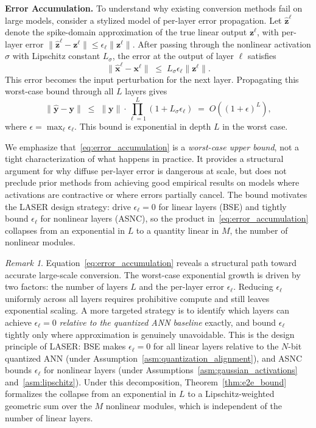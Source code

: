 \documentclass{article}
\theoremstyle{plain}
\theoremstyle{definition}
\theoremstyle{remark}
\newtheorem{remark}[theorem]{Remark}
\begin{document}
\noindent\textbf{Error Accumulation.}
\label{subsec:error_accumulation}
To understand why existing conversion methods fail on large models, consider a stylized
model of per-layer error propagation. Let
$\hat{\mathbf{z}}^\ell$ denote the spike-domain approximation of the true linear
output $\mathbf{z}^\ell$, with per-layer error
$\|\hat{\mathbf{z}}^\ell - \mathbf{z}^\ell\| \le \epsilon_\ell
\|\mathbf{z}^\ell\|$.
After passing through the nonlinear activation $\sigma$ with Lipschitz constant
$L_\sigma$, the error at the output of layer $\ell$ satisfies
\[
\|\hat{\mathbf{x}}^\ell - \mathbf{x}^\ell\|
\;\le\; L_\sigma \epsilon_\ell \|\mathbf{z}^\ell\|.
\]
This error becomes the input perturbation for the next layer. Propagating this
worst-case bound through all $L$ layers gives
\begin{equation}
\label{eq:error_accumulation}
\bigl\|\hat{\mathbf{y}} - \mathbf{y}\bigr\|
\;\le\; \|\mathbf{y}\| \cdot \prod_{\ell=1}^{L}(1 + L_\sigma \epsilon_\ell)
\;=\; O\!\left((1 + \epsilon)^L\right),
\end{equation}
where $\epsilon = \max_\ell \epsilon_\ell$. This bound is exponential in depth
$L$ in the worst case.

We emphasize that~\eqref{eq:error_accumulation} is a \emph{worst-case upper bound},
not a tight characterization of what happens in practice. It provides a structural
argument for why diffuse per-layer error is dangerous at scale, but does not preclude
prior methods from achieving good empirical results on models where activations are
contractive or where errors partially cancel. The bound motivates the LASER design
strategy: drive $\epsilon_\ell = 0$ for linear layers (BSE) and tightly bound
$\epsilon_\ell$ for nonlinear layers (ASNC), so the product
in~\eqref{eq:error_accumulation} collapses from an exponential in $L$ to a quantity
linear in $M$, the number of nonlinear modules.

\begin{remark}
\label{rem:error_structure}
Equation~\eqref{eq:error_accumulation} reveals a structural path toward accurate
large-scale conversion. The worst-case exponential growth is driven by two factors:
the number of layers $L$ and the per-layer error $\epsilon_\ell$. Reducing
$\epsilon_\ell$ uniformly across all layers requires prohibitive compute and still
leaves exponential scaling. A more targeted strategy is to identify which layers can
achieve $\epsilon_\ell = 0$ \emph{relative to the quantized ANN baseline} exactly,
and bound $\epsilon_\ell$ tightly only where approximation is genuinely unavoidable.
This is the design principle of LASER: BSE makes $\epsilon_\ell = 0$ for all linear
layers relative to the $N$-bit quantized ANN (under Assumption~\ref{asm:quantization_alignment}),
and ASNC bounds $\epsilon_\ell$ for nonlinear layers (under Assumptions~\ref{asm:gaussian_activations}
and~\ref{asm:lipschitz}). Under this decomposition, Theorem~\ref{thm:e2e_bound}
formalizes the collapse from an exponential in $L$ to a Lipschitz-weighted geometric
sum over the $M$ nonlinear modules, which is independent of the number of linear
layers.
\end{remark}
\end{document}
